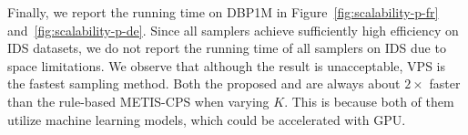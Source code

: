 Finally, we report the running time on DBP1M in Figure~\ref{fig:scalability-p-fr} and~\ref{fig:scalability-p-de}. Since all samplers achieve sufficiently high efficiency on IDS datasets, we do not report the running time of all samplers on IDS due to space limitations. We observe that although the result is unacceptable, VPS is the fastest sampling method. Both the proposed \MetisGCN{} and \KMeans{} are always about $2\times$ faster than the rule-based METIS-CPS when varying $K$. This is because both of them utilize machine learning models, which could be accelerated with GPU. 





